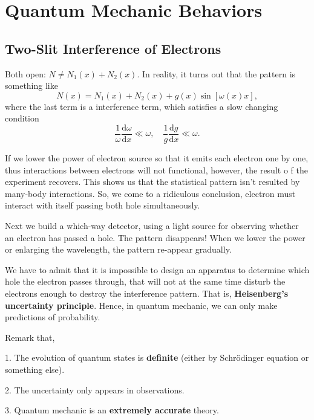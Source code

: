 
\chapter{Quantum Mechanic Behaviors}

\section{Two-Slit Interference of Electrons}
Both open: $N \neq N_1(x) + N_2(x)$. In reality, it turns out that the pattern is something like 
\begin{equation}
  N(x) = N_1(x) + N_2(x) + g(x)\sin \left[ \omega(x) x\right],
\end{equation}
where the last term is a interference term,
which satisfies a slow changing condition
\begin{equation}
  \frac{1}{\omega} \frac{\mathrm{d}\omega}{\mathrm{d} x} \ll \omega, \quad \frac{1}{g}\frac{\mathrm{d}g}{\mathrm{d} x} \ll \omega.
\end{equation}

If we lower the power of electron source so that it emits each electron one by one, thus interactions between electrons will not functional, however, the result o  f the experiment recovers. This shows us that the statistical pattern isn't resulted by many-body interactions. So, we come to a ridiculous conclusion, electron must interact with itself passing both hole simultaneously.

Next we build a which-way detector, using a light source for observing whether an electron has passed a hole. The pattern disappears! When we lower the power or enlarging the wavelength, the pattern re-appear gradually.

We have to admit that it is impossible to design an apparatus to determine which hole the electron passes through, 
that will not at the same time disturb the electrons enough to destroy the interference pattern.
That is, \textbf{Heisenberg's uncertainty principle}. Hence, in quantum mechanic, we can only make predictions of probability.

Remark that,

1. The evolution of quantum states is \textbf{definite} (either by Schr\"odinger equation or something else).

2. The uncertainty only appears in observations.

3. Quantum mechanic is an \textbf{extremely accurate} theory.